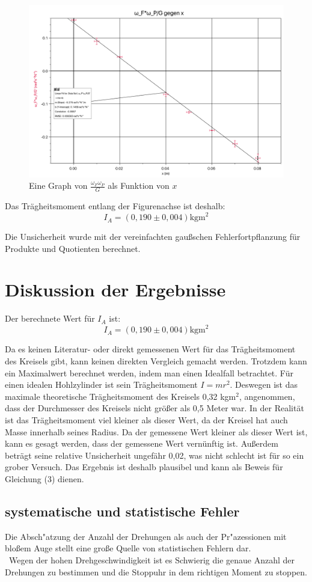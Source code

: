 \documentclass[11pt,a4paper]{article} %
\begin{document}
\begin{figure}
	\newpage
	\centering
	\includegraphics[width=\linewidth]{Abb1}
	\caption{Eine Graph von $\frac{\omega_F\omega_P}{G}$ als Funktion von $x$}
\end{figure}
Das Trägheitsmoment entlang der Figurenachse ist deshalb:
$$I_A = (0,190 \pm 0,004) \textrm{kgm}^2$$

Die Unsicherheit wurde mit der vereinfachten gaußschen Fehlerfortpflanzung für Produkte und Quotienten berechnet. 
\section{Diskussion der Ergebnisse}
Der berechnete Wert für $I_A$ ist:
$$I_A = (0,190 \pm 0,004) \textrm{kgm}^2$$

Da es keinen Literatur- oder direkt gemessenen Wert für das Trägheitsmoment des Kreisels gibt, kann keinen direkten Vergleich gemacht werden. Trotzdem kann ein Maximalwert berechnet werden, indem man einen Idealfall betrachtet. Für einen idealen Hohlzylinder ist sein Trägheitsmoment $I = mr^2$. Deswegen ist das maximale theoretische Trägheitsmoment des Kreisels 0,32 kgm$^2$, angenommen, dass der Durchmesser des Kreisels nicht größer als 0,5 Meter war. In der Realität ist das Trägheitsmoment viel kleiner als dieser Wert, da der Kreisel hat auch Masse innerhalb seines Radius. Da der gemessene Wert kleiner als dieser Wert ist, kann es gesagt werden, dass der gemessene Wert vernünftig ist. Außerdem beträgt seine relative Unsicherheit ungefähr 0,02, was nicht schlecht ist für so ein grober Versuch. Das Ergebnis ist deshalb plausibel und kann als Beweis für Gleichung (3) dienen. 

\subsection{systematische und statistische Fehler}
Die Absch"atzung der Anzahl der Drehungen als auch der Pr"azessionen mit bloßem Auge stellt eine große Quelle von statistischen Fehlern dar.
\\\
Wegen der hohen Drehgeschwindigkeit ist es  Schwierig die genaue Anzahl der Drehungen zu bestimmen und die Stoppuhr in dem richtigen Moment zu stoppen.
\end{document}
